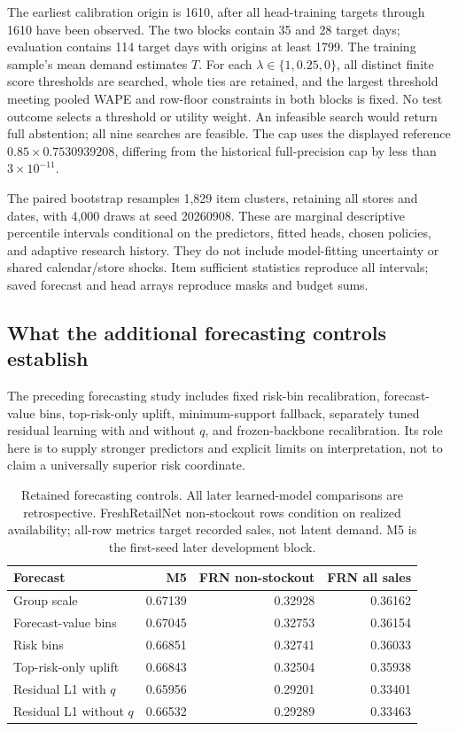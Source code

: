The earliest calibration origin is 1610, after all head-training targets through 1610 have been observed. The two blocks contain 35 and 28 target days; evaluation contains 114 target days with origins at least 1799. The training sample's mean demand estimates $T$. For each $\lambda\in\{1,0.25,0\}$, all distinct finite score thresholds are searched, whole ties are retained, and the largest threshold meeting pooled WAPE and row-floor constraints in both blocks is fixed. No test outcome selects a threshold or utility weight. An infeasible search would return full abstention; all nine searches are feasible. The cap uses the displayed reference $0.85\times0.7530939208$, differing from the historical full-precision cap by less than $3\times10^{-11}$.




The paired bootstrap resamples 1,829 item clusters, retaining all stores and dates, with 4,000 draws at seed 20260908. These are marginal descriptive percentile intervals conditional on the predictors, fitted heads, chosen policies, and adaptive research history. They do not include model-fitting uncertainty or shared calendar/store shocks. Item sufficient statistics reproduce all intervals; saved forecast and head arrays reproduce masks and budget sums.

\subsection{What the additional forecasting controls establish}
The preceding forecasting study includes fixed risk-bin recalibration, forecast-value bins, top-risk-only uplift, minimum-support fallback, separately tuned residual learning with and without $q$, and frozen-backbone recalibration. Its role here is to supply stronger predictors and explicit limits on interpretation, not to claim a universally superior risk coordinate.

\begin{table}[htbp]\centering\small
\caption{Retained forecasting controls. All later learned-model comparisons are retrospective. FreshRetailNet non-stockout rows condition on realized availability; all-row metrics target recorded sales, not latent demand. M5 is the first-seed later development block.}
\label{tab:forecast-controls}
\begin{tabular}{lrrr}\toprule
Forecast & M5 & FRN non-stockout & FRN all sales\\\midrule
Group scale & 0.67139 & 0.32928 & 0.36162\\
Forecast-value bins & 0.67045 & 0.32753 & 0.36154\\
Risk bins & 0.66851 & 0.32741 & 0.36033\\
Top-risk-only uplift & 0.66843 & 0.32504 & 0.35938\\
Residual L1 with $q$ & 0.65956 & 0.29201 & 0.33401\\
Residual L1 without $q$ & 0.66532 & 0.29289 & 0.33463\\\bottomrule
\end{tabular}\end{table}

